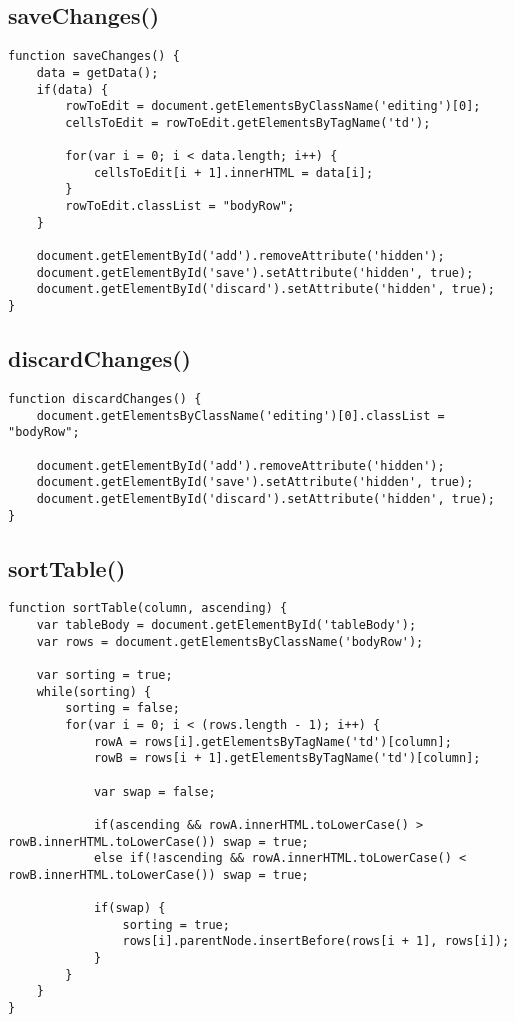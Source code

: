 \documentclass[letterpaper]{article}
\begin{document}
\subsection{saveChanges()}

\begin{lstlisting}[firstnumber=203]
function saveChanges() {
    data = getData();
    if(data) {
        rowToEdit = document.getElementsByClassName('editing')[0];
        cellsToEdit = rowToEdit.getElementsByTagName('td');

        for(var i = 0; i < data.length; i++) {
            cellsToEdit[i + 1].innerHTML = data[i];
        }
        rowToEdit.classList = "bodyRow";
    }

    document.getElementById('add').removeAttribute('hidden');
    document.getElementById('save').setAttribute('hidden', true);
    document.getElementById('discard').setAttribute('hidden', true);
}
\end{lstlisting}

\subsection{discardChanges()}

\begin{lstlisting}[firstnumber=220]
function discardChanges() {
    document.getElementsByClassName('editing')[0].classList = "bodyRow";

    document.getElementById('add').removeAttribute('hidden');
    document.getElementById('save').setAttribute('hidden', true);
    document.getElementById('discard').setAttribute('hidden', true);
}
\end{lstlisting}

\subsection{sortTable()}

\begin{lstlisting}[firstnumber=228]
function sortTable(column, ascending) {
    var tableBody = document.getElementById('tableBody');
    var rows = document.getElementsByClassName('bodyRow');

    var sorting = true;
    while(sorting) {
        sorting = false;
        for(var i = 0; i < (rows.length - 1); i++) {
            rowA = rows[i].getElementsByTagName('td')[column];
            rowB = rows[i + 1].getElementsByTagName('td')[column];

            var swap = false;

            if(ascending && rowA.innerHTML.toLowerCase() > rowB.innerHTML.toLowerCase()) swap = true;
            else if(!ascending && rowA.innerHTML.toLowerCase() < rowB.innerHTML.toLowerCase()) swap = true;

            if(swap) {
                sorting = true;
                rows[i].parentNode.insertBefore(rows[i + 1], rows[i]);
            }
        }
    }
}
\end{lstlisting}
\end{document}
